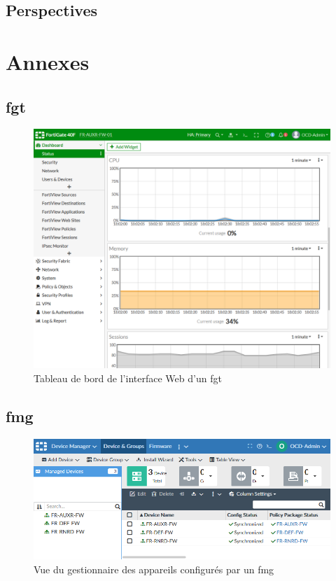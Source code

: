 \documentclass[12pt, oneside, a4paper, titlepage]{report}
\begin{document}
\section{Perspectives}%
\label{sec:conclu::persp}


\chapter{Annexes}%
\label{cha:annexes}

\section{\acrlong{fgt}}%
\label{sec:annexes::fgt}

\begin{figure}[h!]
    \centering
    \includegraphics[width = \linewidth]{img/fgt-auxr/dashboard.png}
    \caption{Tableau de bord de l'interface Web d'un \acrlong{fgt}}%
    \label{fig:fgt-auxr/dashboard.png}
\end{figure}

\section{\acrlong{fmg}}%
\label{sec:annexes::fmg}

\begin{figure}[h!]
    \centering
    \includegraphics[width = \linewidth]{img/fmg/device-manager.png}
    \caption{Vue du gestionnaire des appareils configurés par un \acrlong{fmg}}%
    \label{fig:fmg/device-manager.png}
\end{figure}
\end{document}
